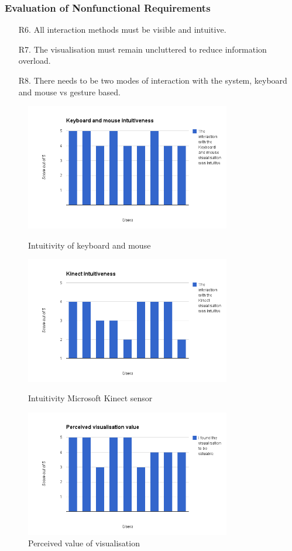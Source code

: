 \subsubsection{Evaluation of Nonfunctional Requirements}
\begin{enumerate}
 \item[R6.] All interaction methods must be visible and intuitive.

 \item[R7.] The visualisation must remain uncluttered to reduce information
overload.

 \item[R8.]  There needs to be two modes of interaction with the system,
keyboard and mouse vs gesture based.
\end{enumerate}

\begin{figure}[H]
  \centering
      \includegraphics[width=0.8\textwidth]{images/charts/chart_1.png}
  \caption{Intuitivity of keyboard and mouse}  
    \label{fig:chart1}
      \includegraphics[width=0.8\textwidth]{images/charts/chart_2.png}
  \caption{Intuitivity Microsoft Kinect sensor}  
    \label{fig:chart2}
      \includegraphics[width=0.8\textwidth]{images/charts/chart_3.png}
  \caption{Perceived value of visualisation}  
    \label{fig:chart3}
\end{figure}

